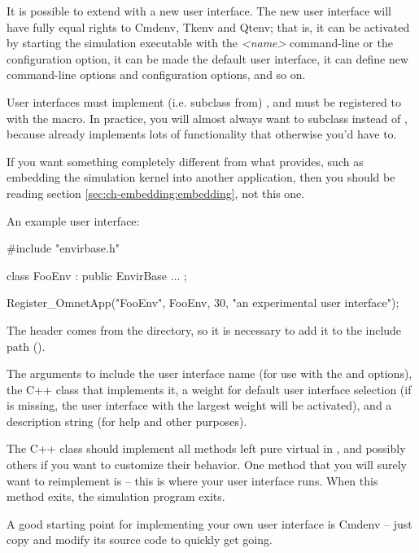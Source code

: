 It is possible to extend {\opp} with a new user interface. The new
user interface will have fully equal rights to Cmdenv, Tkenv and Qtenv;
that is, it can be activated by starting the simulation executable with the
 \textit{<name>} command-line or the 
configuration option, it can be made the default user interface,
it can define new command-line options and configuration options,
and so on.

User interfaces must implement (i.e. subclass from) ,
and must be registered to {\opp} with the  macro.
In practice, you will almost always want to subclass 
instead of , because  already
implements lots of functionality that otherwise you'd have to.

\begin{note}
If you want something completely different from what 
provides, such as embedding the simulation kernel into another
application, then you should be reading section \ref{sec:ch-embedding:embedding},
not this one.
\end{note}

An example user interface:

\begin{cpp}
#include "envirbase.h"

class FooEnv : public EnvirBase
{
    ...
};

Register_OmnetApp("FooEnv", FooEnv, 30, "an experimental user interface");
\end{cpp}

The  header comes from the  directory,
so it is necessary to add it to the include path ().

The arguments to  include the user interface name
(for use with the  and  options),
the C++ class that implements it, a weight for default user interface selection
(if  is missing, the user interface with the largest weight will be
activated), and a description string (for help and other purposes).

The C++ class should implement all methods left pure virtual in
, and possibly others if you want to customize
their behavior. One method that you will surely want to reimplement is
 -- this is where your user interface runs. When this method
exits, the simulation program exits.

\begin{note}
A good starting point for implementing your own user interface is
Cmdenv -- just copy and modify its source code to quickly get going.
\end{note}



